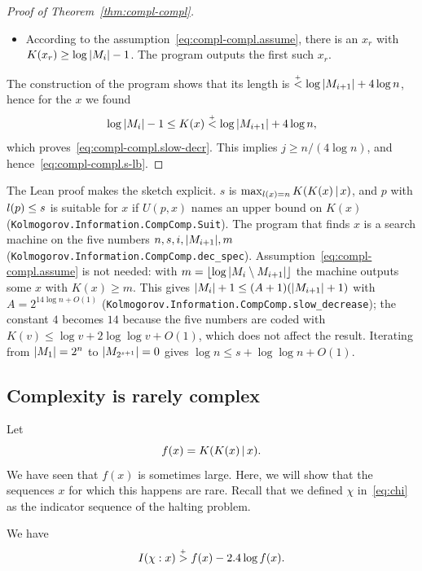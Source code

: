 \begin{proof}[Proof of Theorem~\protect\ref{thm:compl-compl}]
\begin{itemize}
  \item According to the assumption~\eqref{eq:compl-compl.assume},
there is an \( x_{r} \) with \( K(x_{r}) \ge \log|M_{i}| - 1 \).
The program outputs the first such \( x_{r} \).

 \end{itemize}
The construction of the program shows that its length is
\( \stackrel{{}_+}{<} \log|M_{i+1}| + 4\log n \), hence for the \( x \) 
we found 
 \[
   \log|M_{i}| - 1 \le K(x) \stackrel{{}_+}{<} \log|M_{i+1}| + 4\log n,
 \]
which proves~\eqref{eq:compl-compl.slow-decr}.
This implies \( j \ge n/(4 \log n) \), and hence~\eqref{eq:compl-compl.s-lb}.
 \end{proof}

\begin{formalization}
The Lean proof makes the sketch explicit. \( s \) is \( \max_{l(x) = n} K(K(x) \,\vert\, x) \),
and \( p \) with \( l(p) \le s \) is suitable for \( x \) if \( U(p, x) \) names an upper bound on
\( K(x) \) (\texttt{Kolmogorov.Information.CompComp.Suit}). The program that finds \( x \) is a
search machine on the five numbers \( n, s, i, |M_{i+1}|, m \)
(\texttt{Kolmogorov.Information.CompComp.dec\_spec}). Assumption~\eqref{eq:compl-compl.assume}
is not needed: with \( m = \lfloor \log |M_{i} \setminus M_{i+1}| \rfloor \) the machine outputs
some \( x \) with \( K(x) \ge m \). This gives
\( |M_{i}| + 1 \le (A + 1)(|M_{i+1}| + 1) \) with
\( A = 2^{14 \log n + O(1)} \) (\texttt{Kolmogorov.Information.CompComp.slow\_decrease}); the
constant \( 4 \) becomes \( 14 \) because the five numbers are coded with
\( K(v) \le \log v + 2 \log\log v + O(1) \), which does not affect the result. Iterating from
\( |M_{1}| = 2^{n} \) to \( |M_{2^{s+1}}| = 0 \) gives \( \log n \le s + \log\log n + O(1) \).
\end{formalization}


\subsection{Complexity is rarely complex}

Let
 \[
  f(x) = K(K(x) \,\vert\, x).
 \]
We have seen that \( f(x) \) is sometimes large.
Here, we will show that the sequences \( x \) for which this happens are rare.
Recall that we defined \( \chi \) in~\eqref{eq:chi} as
the indicator sequence of the halting problem.

 \begin{theorem}\label{thm:co-rarely-co}
  \leanok
We have
 \[
   I(\chi : x) \stackrel{{}_+}{>} f(x) - 2.4 \log f(x).
 \]
 \end{theorem}

